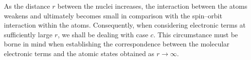 As the distance $r$ between the nuclei increases, the interaction between the atoms weakens and ultimately becomes small in comparison with the spin--orbit interaction within the atoms. Consequently, when considering electronic terms at sufficiently large $r$, we shall be dealing with case $c$. This circumstance must be borne in mind when establishing the correspondence between the molecular electronic terms and the atomic states obtained as $r\to\infty$.
